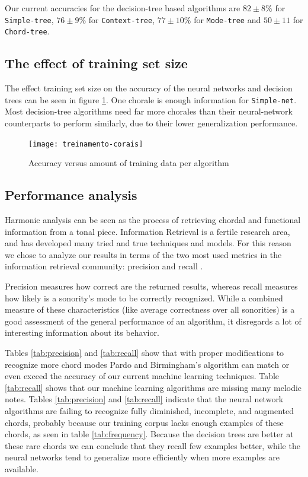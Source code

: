 \documentclass{article}
\begin{document}
Our current accuracies for the decision-tree based algorithms are $82
\pm 8\%$ for \texttt{Simple-tree}, $76 \pm 9\%$ for
\texttt{Context-tree}, $77 \pm 10\%$ for \texttt{Mode-tree} and $50
\pm 11$ for \texttt{Chord-tree}.

\subsection{The effect of training set size}

The effect training set size on the accuracy of the neural networks
and decision trees can be seen in figure
\ref{fig:treinamento-corais}. One chorale is enough information for
\texttt{Simple-net}. Most decision-tree algorithms need far more
chorales than their neural-network counterparts to perform similarly,
due to their lower generalization performance.

\begin{figure}
  \texttt{[image: treinamento-corais]}
  \caption{Accuracy versus amount of training data per algorithm}
  \label{fig:treinamento-corais}
\end{figure}


\subsection{Performance analysis}
\label{sec:common-errors}

Harmonic analysis can be seen as the process of retrieving chordal and
functional information from a tonal piece. Information Retrieval is a
fertile research area, and has developed many tried and true
techniques and models. For this reason we chose to analyze our results
in terms of the two most used metrics in the information retrieval
community: precision and recall \cite{russell.ea:artificial}.

Precision measures how correct are the returned results, whereas
recall measures how likely is a sonority's mode to be correctly
recognized. While a combined measure of these characteristics (like
average correctness over all sonorities) is a good assessment of the
general performance of an algorithm, it disregards a lot of
interesting information about its behavior.

Tables \ref{tab:precision} and \ref{tab:recall} show that with proper
modifications to recognize more chord modes Pardo and Birmingham's
algorithm can match or even exceed the accuracy of our current machine
learning techniques. Table \ref{tab:recall} shows that our machine
learning algorithms are missing many melodic notes. Tables
\ref{tab:precision} and \ref{tab:recall} indicate that the neural
network algorithms are failing to recognize fully diminished,
incomplete, and augmented chords, probably because our training corpus
lacks enough examples of these chords, as seen in table
\ref{tab:frequency}. Because the decision trees are better at these
rare chords we can conclude that they recall few examples better,
while the neural networks tend to generalize more efficiently when
more examples are available.
\end{document}
